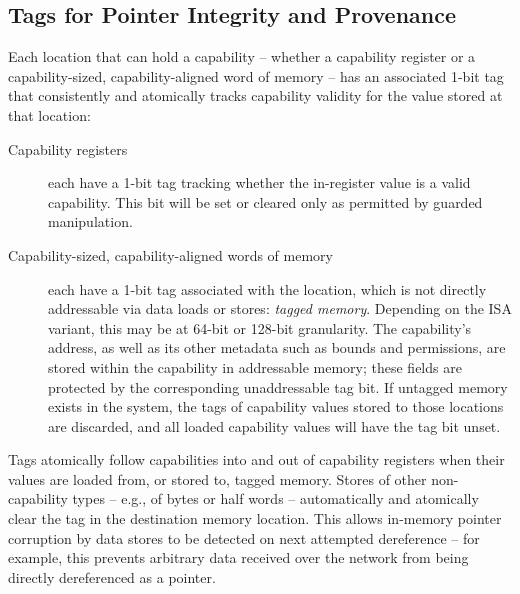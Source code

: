 
\subsection{Tags for Pointer Integrity and Provenance}
\label{sec:model-tags}

Each location that can hold a capability -- whether a capability register or a
capability-sized, capability-aligned word of memory -- has an associated 1-bit
tag that consistently and atomically tracks capability validity for the value
stored at that location:

\begin{description}
\item[Capability registers] each have a 1-bit tag tracking whether the
  in-register value is a valid capability.
  This bit will be set or cleared only as permitted by guarded manipulation.

\item[Capability-sized, capability-aligned words of memory] each have a 1-bit
  tag associated with the location, which is not directly addressable via data
  loads or stores: \textit{tagged memory}.
  Depending on the ISA variant, this may be at 64-bit or 128-bit granularity.
  The capability's address, as well as its other metadata such as
  bounds and permissions, are stored within the capability in addressable
  memory; these fields are protected by the corresponding unaddressable tag
  bit.
  If untagged memory exists in the system, the tags of capability values
  stored to those locations are discarded, and all loaded capability values
  will have the tag bit unset.
\end{description}

\noindent
Tags atomically follow capabilities into and out of capability registers when
their values are loaded from, or stored to, tagged memory.
Stores of other non-capability types -- e.g., of bytes or half words --
automatically and atomically clear the tag in the destination memory location.
This allows in-memory pointer corruption by data stores to be detected on next
attempted dereference -- for example, this prevents arbitrary data received
over the network from being directly dereferenced as a pointer.

